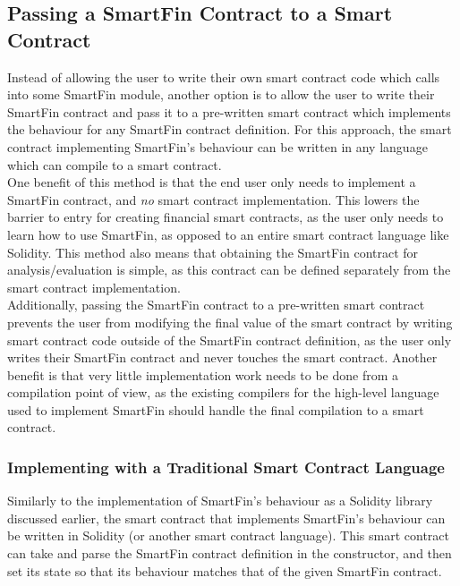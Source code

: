 \subsection{Passing a SmartFin Contract to a Smart Contract} \label{traditional-dsl}

Instead of allowing the user to write their own smart contract code which calls into some SmartFin module, another option is to allow the user to write their SmartFin contract and pass it to a pre-written smart contract which implements the behaviour for any SmartFin contract definition. For this approach, the smart contract implementing SmartFin's behaviour can be written in any language which can compile to a smart contract. \\

One benefit of this method is that the end user only needs to implement a SmartFin contract, and \textit{no} smart contract implementation. This lowers the barrier to entry for creating financial smart contracts, as the user only needs to learn how to use SmartFin, as opposed to an entire smart contract language like Solidity. This method also means that obtaining the SmartFin contract for analysis/evaluation is simple, as this contract can be defined separately from the smart contract implementation. \\

Additionally, passing the SmartFin contract to a pre-written smart contract prevents the user from modifying the final value of the smart contract by writing smart contract code outside of the SmartFin contract definition, as the user only writes their SmartFin contract and never touches the smart contract. Another benefit is that very little implementation work needs to be done from a compilation point of view, as the existing compilers for the high-level language used to implement SmartFin should handle the final compilation to a smart contract.


\subsubsection{Implementing with a Traditional Smart Contract Language}

Similarly to the implementation of SmartFin's behaviour as a Solidity library discussed earlier, the smart contract that implements SmartFin's behaviour can be written in Solidity (or another smart contract language). This smart contract can take and parse the SmartFin contract definition in the constructor, and then set its state so that its behaviour matches that of the given SmartFin contract.


